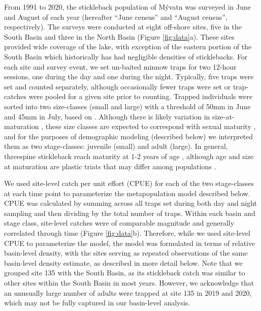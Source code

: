 \documentclass[11pt]{article}
\begin{document}
From 1991 to 2020, 
the stickleback population of M\'{y}vatn was surveyed in June and August of each year
(hereafter ``June census'' and ``August census'', respectively). 
The surveys were conducted at eight off-shore sites, 
five in the South Basin and three in the North Basin
(Figure \ref{fig:data}a).
These sites provided wide coverage of the lake,
with exception of the eastern portion of the South Basin 
which historically has had negligible densities of sticklebacks.
For each site and survey event, 
we set un-baited minnow traps for two 12-hour sessions, 
one during the day and one during the night. 
Typically, five traps were set and counted separately, 
although occasionally fewer traps were set or 
trap-catches were pooled for a given site prior to counting.
Trapped individuals were sorted into two size-classes (small and large)
with a threshold of 50mm in June and 45mm in July, based on \citep{gislason1998}. 
Although there is likely variation in size-at-maturation \citep{singkam2019},
these size classes are expected to correspond with sexual maturity 
\citep{gudmundsson1996, gislason1998},
and for the purposes of demographic modeling (described below) 
we interpreted them as two stage-classes: juvenile (small) and adult (large).
In general, threespine stickleback reach maturity at 1-2 years of age
\citep{baker2008overview},
although age and size at maturation are plastic triats \citep{baker2015life}
that may differ among populations \citep{snyder1991migration}.

We used site-level catch per unit effort (CPUE) for each of the two stage-classes 
at each time point to parameterize the metapopulation model described below. 
CPUE was calculated by summing across all traps set during both day and night sampling
and then dividing by the total number of traps.
Within each basin and stage class, 
site-level catches were of comparable magnitude and 
generally correlated through time (Figure \ref{fig:data}b).
Therefore, while we used site-level CPUE to parameterize the model, 
the model was formulated in terms of relative basin-level density,
with the sites serving as repeated observations of the same basin-level density estimate,
as described in more detail below.
Note that we grouped site 135 with the South Basin, 
as its stickleback catch was similar to other sites within the South Basin in most years.
However, 
we acknowledge that an unusually large number of adults were trapped at site 135
in 2019 and 2020, which may not be fully captured in our basin-level analysis.
\end{document}

